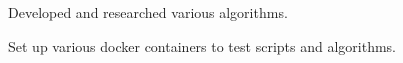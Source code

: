 \documentclass[letterpaper]{deedy-resume} %
\begin{document}
\begin{minipage}[t]{0.66\textwidth}
\sectionspace %



\begin{tightitemize}
\item Developed and researched various algorithms.
\item Set up various docker containers to test scripts and algorithms. 
\end{tightitemize}

\sectionspace %


\end{minipage} %
\end{document}
